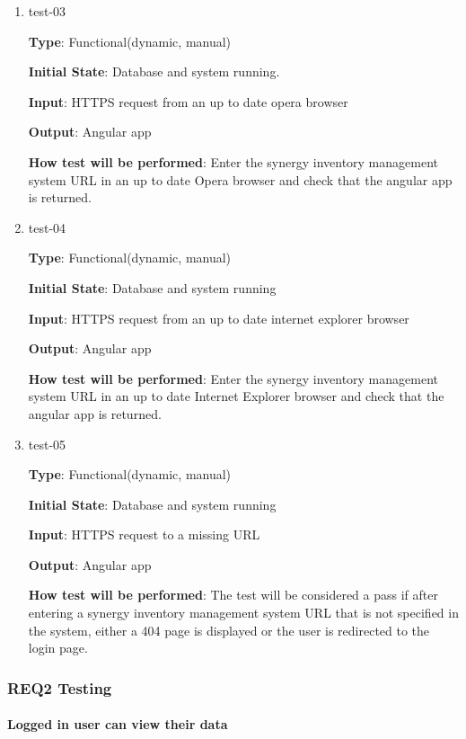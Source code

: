 \documentclass[12pt, titlepage]{article}
\begin{document}
\begin{enumerate}
\item{test-03\\}

\textbf{Type}: Functional(dynamic, manual)
					
\textbf{Initial State}: Database and system running.
					
\textbf{Input}: HTTPS request from an up to date opera browser
					
\textbf{Output}: Angular app
					
\textbf{How test will be performed}: Enter the synergy inventory management system URL in an up to date Opera browser and check that the angular app is returned.

\item{test-04\\}

\textbf{Type}: Functional(dynamic, manual)
					
\textbf{Initial State}: Database and system running
					
\textbf{Input}: HTTPS request from an up to date internet explorer browser
					
\textbf{Output}: Angular app
					
\textbf{How test will be performed}: Enter the synergy inventory management system URL in an up to date Internet Explorer browser and check that the angular app is returned.

\item{test-05\\}

\textbf{Type}: Functional(dynamic, manual)
					
\textbf{Initial State}: Database and system running
					
\textbf{Input}: HTTPS request to a missing URL
					
\textbf{Output}: Angular app
					
\textbf{How test will be performed}: The test will be considered a pass if after entering a synergy inventory management system URL that is not specified in the system, either a 404 page is displayed or the user is redirected to the login page.

\end{enumerate}

\subsubsection{REQ2 Testing}
		
\paragraph{Logged in user can view their data}
\end{document}
